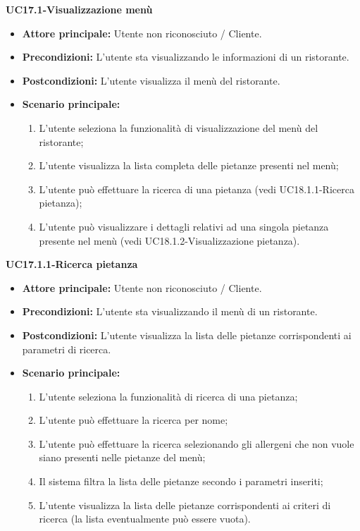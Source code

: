 \pagebreak
\textbf{UC17.1-Visualizzazione menù}  %
\begin{itemize}
\item \textbf{Attore principale:} Utente non riconosciuto / Cliente.
\item \textbf{Precondizioni:} L'utente sta visualizzando le informazioni di un ristorante.
\item \textbf{Postcondizioni:} L'utente visualizza il menù del ristorante.
\item \textbf{Scenario principale:}
\begin{enumerate}
    \item L'utente seleziona la funzionalità di visualizzazione del menù del ristorante;
    \item L'utente visualizza la lista completa delle pietanze presenti nel menù;
    \item L'utente può effettuare la ricerca di una pietanza (vedi UC18.1.1-Ricerca pietanza);
    \item L'utente può visualizzare i dettagli relativi ad una singola pietanza presente
     nel menù (vedi UC18.1.2-Visualizzazione pietanza).
\end{enumerate}
\end{itemize}

\textbf{UC17.1.1-Ricerca pietanza}  %
\begin{itemize}
\item \textbf{Attore principale:} Utente non riconosciuto / Cliente.
\item \textbf{Precondizioni:} L'utente sta visualizzando il menù di un ristorante.
\item \textbf{Postcondizioni:} L'utente visualizza la lista delle pietanze corrispondenti ai parametri di ricerca.
\item \textbf{Scenario principale:}
\begin{enumerate}
    \item L'utente seleziona la funzionalità di ricerca di una pietanza;
    \item L'utente può effettuare la ricerca per nome;
    \item L'utente può effettuare la ricerca selezionando gli allergeni che non vuole
    siano presenti nelle pietanze del menù;
    \item Il sistema filtra la lista delle pietanze secondo i parametri inseriti;
    \item L'utente visualizza la lista delle pietanze corrispondenti ai criteri di ricerca
    (la lista eventualmente può essere vuota).
\end{enumerate}
\end{itemize}

